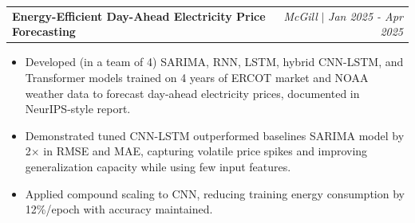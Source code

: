 \documentclass[letterpaper,11pt]{article}
\makeatletter
\newcommand{\resumeItem}[1]{
  \item\small{
    {#1 \vspace{-2pt}}
  }
}
\newcommand{\resumeProjectHeading}[2]{
    \item\small
    \begin{tabular*}{0.97\textwidth}{l@{\extracolsep{\fill}}r}
      \small#1 & #2 \\
    \end{tabular*}\vspace{-7pt}
}
\newcommand{\resumeItemListStart}{\begin{itemize}}
\newcommand{\resumeItemListEnd}{\end{itemize}\vspace{-5pt}}
\makeatother
\begin{document}
  \resumeProjectHeading
      {\textbf{Energy-Efficient Day-Ahead Electricity Price Forecasting}}{\emph{McGill} $|$ \textit{Jan 2025 - Apr 2025}}
      \resumeItemListStart
        \resumeItem{Developed (in a team of 4) SARIMA, RNN, LSTM, hybrid CNN-LSTM, and Transformer models trained on 4 years of ERCOT market and NOAA weather data to forecast day-ahead electricity prices, documented in NeurIPS-style report.}
        \resumeItem{Demonstrated tuned CNN-LSTM outperformed baselines SARIMA model by 2$\times$ in RMSE and MAE, capturing volatile price spikes and improving generalization capacity while using few input features.}
        \resumeItem{Applied compound scaling to CNN, reducing training energy consumption by 12\%/epoch with accuracy maintained.}
      \resumeItemListEnd



        
\end{document}
